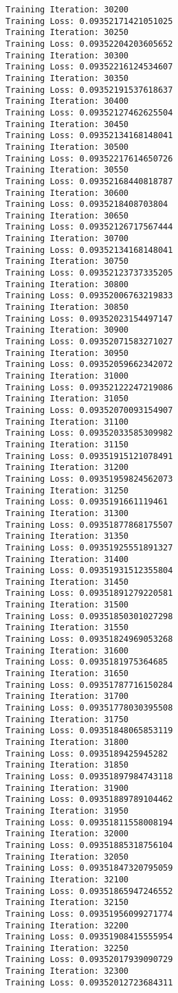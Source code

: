 \documentclass[11pt]{article}
\begin{document}
\begin{Verbatim}[commandchars=\\\{\}]
Training Iteration: 30200
Training Loss: 0.09352171421051025
Training Iteration: 30250
Training Loss: 0.09352204203605652
Training Iteration: 30300
Training Loss: 0.09352216124534607
Training Iteration: 30350
Training Loss: 0.09352191537618637
Training Iteration: 30400
Training Loss: 0.09352127462625504
Training Iteration: 30450
Training Loss: 0.09352134168148041
Training Iteration: 30500
Training Loss: 0.09352217614650726
Training Iteration: 30550
Training Loss: 0.09352168440818787
Training Iteration: 30600
Training Loss: 0.0935218408703804
Training Iteration: 30650
Training Loss: 0.09352126717567444
Training Iteration: 30700
Training Loss: 0.09352134168148041
Training Iteration: 30750
Training Loss: 0.09352123737335205
Training Iteration: 30800
Training Loss: 0.09352006763219833
Training Iteration: 30850
Training Loss: 0.09352023154497147
Training Iteration: 30900
Training Loss: 0.09352071583271027
Training Iteration: 30950
Training Loss: 0.09352059662342072
Training Iteration: 31000
Training Loss: 0.09352122247219086
Training Iteration: 31050
Training Loss: 0.09352070093154907
Training Iteration: 31100
Training Loss: 0.09352033585309982
Training Iteration: 31150
Training Loss: 0.09351915121078491
Training Iteration: 31200
Training Loss: 0.09351959824562073
Training Iteration: 31250
Training Loss: 0.0935191661119461
Training Iteration: 31300
Training Loss: 0.09351877868175507
Training Iteration: 31350
Training Loss: 0.09351925551891327
Training Iteration: 31400
Training Loss: 0.09351931512355804
Training Iteration: 31450
Training Loss: 0.09351891279220581
Training Iteration: 31500
Training Loss: 0.09351850301027298
Training Iteration: 31550
Training Loss: 0.09351824969053268
Training Iteration: 31600
Training Loss: 0.0935181975364685
Training Iteration: 31650
Training Loss: 0.09351787716150284
Training Iteration: 31700
Training Loss: 0.09351778030395508
Training Iteration: 31750
Training Loss: 0.09351848065853119
Training Iteration: 31800
Training Loss: 0.0935189425945282
Training Iteration: 31850
Training Loss: 0.09351897984743118
Training Iteration: 31900
Training Loss: 0.09351889789104462
Training Iteration: 31950
Training Loss: 0.09351811558008194
Training Iteration: 32000
Training Loss: 0.09351885318756104
Training Iteration: 32050
Training Loss: 0.09351847320795059
Training Iteration: 32100
Training Loss: 0.09351865947246552
Training Iteration: 32150
Training Loss: 0.09351956099271774
Training Iteration: 32200
Training Loss: 0.09351908415555954
Training Iteration: 32250
Training Loss: 0.09352017939090729
Training Iteration: 32300
Training Loss: 0.09352012723684311

\end{Verbatim}
\end{document}
